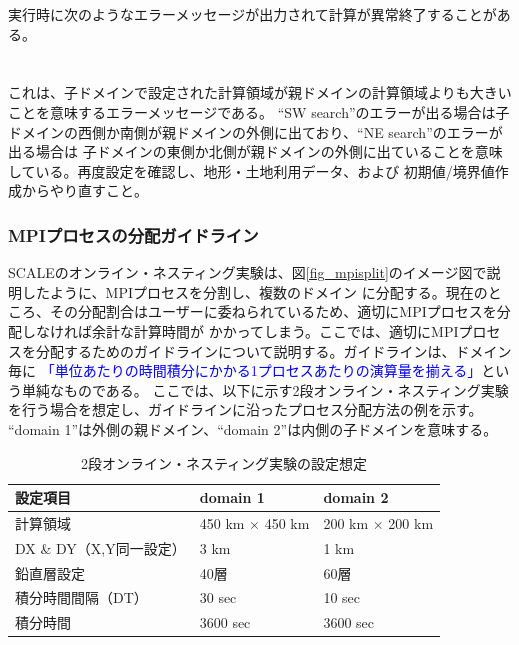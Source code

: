 実行時に次のようなエラーメッセージが出力されて計算が異常終了することがある。\\

\\

\\

\noindent これは、子ドメインで設定された計算領域が親ドメインの計算領域よりも大きいことを意味するエラーメッセージである。
``SW search''のエラーが出る場合は子ドメインの西側か南側が親ドメインの外側に出ており、``NE search''のエラーが出る場合は
子ドメインの東側か北側が親ドメインの外側に出ていることを意味している。再度設定を確認し、地形・土地利用データ、および
初期値/境界値作成からやり直すこと。


\subsubsection{MPIプロセスの分配ガイドライン}
SCALEのオンライン・ネスティング実験は、図\ref{fig_mpisplit}のイメージ図で説明したように、MPIプロセスを分割し、複数のドメイン
に分配する。現在のところ、その分配割合はユーザーに委ねられているため、適切にMPIプロセスを分配しなければ余計な計算時間が
かかってしまう。ここでは、適切にMPIプロセスを分配するためのガイドラインについて説明する。ガイドラインは、ドメイン毎に
\textcolor{blue}{「単位あたりの時間積分にかかる1プロセスあたりの演算量を揃える」}という単純なものである。
ここでは、以下に示す2段オンライン・ネスティング実験を行う場合を想定し、ガイドラインに沿ったプロセス分配方法の例を示す。
``domain 1''は外側の親ドメイン、``domain 2''は内側の子ドメインを意味する。

\begin{table}[htb]
\begin{center}
\caption{2段オンライン・ネスティング実験の設定想定}
\begin{tabularx}{150mm}{|l|l|X|} \hline
 \rowcolor[gray]{0.9} 設定項目 & domain 1 & domain 2 \\ \hline
 計算領域 & 450 km $\times$ 450 km & 200 km $\times$ 200 km \\ \hline
 DX \& DY（X,Y同一設定） & 3 km & 1 km \\ \hline
 鉛直層設定 & 40層 & 60層 \\ \hline
 積分時間間隔（DT）& 30 sec & 10 sec \\ \hline
 積分時間 & 3600 sec & 3600 sec \\ \hline
\end{tabularx}
\label{tab:nest_proc_guide1}
\end{center}
\end{table}

